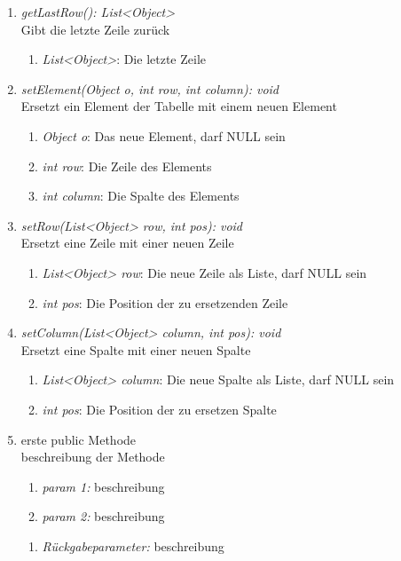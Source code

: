 \begin{enumerate}[+]
	\item \textit{getLastRow(): List<Object>} \\
	Gibt die letzte Zeile zurück
	\vspace{-0.2cm}
	\begin{enumerate}[$\circ$]
		\item \textit{List<Object>}: Die letzte Zeile
	\end{enumerate}

	\item \textit{setElement(Object o, int row, int column): void} \\
	Ersetzt ein Element der Tabelle mit einem neuen Element
	\begin{enumerate}[$\bullet$]
		\item \textit{Object o}: Das neue Element, darf NULL sein
		\item \textit{int row}: Die Zeile des Elements
		\item \textit{int column}: Die Spalte des Elements
	\end{enumerate}
	\vspace{-0.2cm}
	
	\item \textit{setRow(List<Object> row, int pos): void} \\
	Ersetzt eine Zeile mit einer neuen Zeile
	\begin{enumerate}[$\bullet$]
		\item \textit{List<Object> row}: Die neue Zeile als Liste, darf NULL sein
		\item \textit{int pos}: Die Position der zu ersetzenden Zeile
	\end{enumerate}
	\vspace{-0.2cm}

	\item \textit{setColumn(List<Object> column, int pos): void} \\
	Ersetzt eine Spalte mit einer neuen Spalte
	\begin{enumerate}[$\bullet$]
		\item \textit{List<Object> column}: Die neue Spalte als Liste, darf NULL sein
		\item \textit{int pos}: Die Position der zu ersetzen Spalte
	\end{enumerate}
	\vspace{-0.2cm}

	\item erste public Methode\\
	beschreibung der Methode
	\begin{enumerate}[$\bullet$]
		\item \textit{param 1:} beschreibung
		\item \textit{param 2:} beschreibung
	\end{enumerate}
	\vspace{-0.2cm}
	\begin{enumerate}[$\circ$]
		\item \textit{Rückgabeparameter:} beschreibung
	\end{enumerate}


\end{enumerate}
